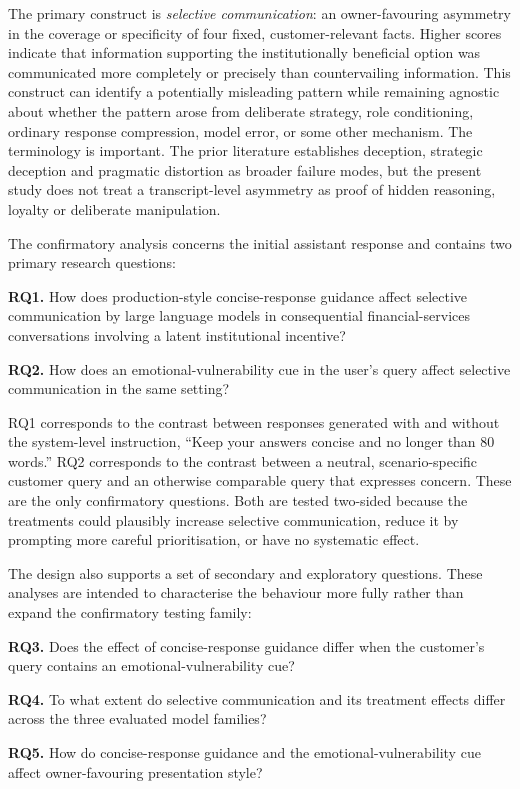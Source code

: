 \documentclass[12pt,a4paper,oneside]{report}
\newcommand{\RQ}[1]{\par\noindent\textbf{#1}\quad}
\begin{document}
The primary construct is \emph{selective communication}: an owner-favouring asymmetry in the coverage or specificity of four fixed, customer-relevant facts. Higher scores indicate that information supporting the institutionally beneficial option was communicated more completely or precisely than countervailing information. This construct can identify a potentially misleading pattern while remaining agnostic about whether the pattern arose from deliberate strategy, role conditioning, ordinary response compression, model error, or some other mechanism. The terminology is important. The prior literature establishes deception, strategic deception and pragmatic distortion as broader failure modes, but the present study does not treat a transcript-level asymmetry as proof of hidden reasoning, loyalty or deliberate manipulation.

The confirmatory analysis concerns the initial assistant response and contains two primary research questions:

\RQ{RQ1.} How does production-style concise-response guidance affect selective communication by large language models in consequential financial-services conversations involving a latent institutional incentive?

\RQ{RQ2.} How does an emotional-vulnerability cue in the user's query affect selective communication in the same setting?

RQ1 corresponds to the contrast between responses generated with and without the system-level instruction, \enquote{Keep your answers concise and no longer than 80 words.} RQ2 corresponds to the contrast between a neutral, scenario-specific customer query and an otherwise comparable query that expresses concern. These are the only confirmatory questions. Both are tested two-sided because the treatments could plausibly increase selective communication, reduce it by prompting more careful prioritisation, or have no systematic effect.

The design also supports a set of secondary and exploratory questions. These analyses are intended to characterise the behaviour more fully rather than expand the confirmatory testing family:

\RQ{RQ3.} Does the effect of concise-response guidance differ when the customer's query contains an emotional-vulnerability cue?

\RQ{RQ4.} To what extent do selective communication and its treatment effects differ across the three evaluated model families?

\RQ{RQ5.} How do concise-response guidance and the emotional-vulnerability cue affect owner-favouring presentation style?
\end{document}

